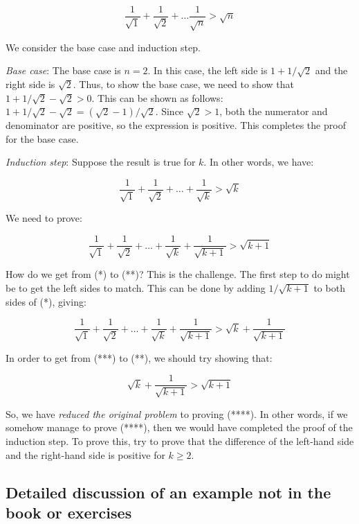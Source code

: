 \documentclass{amsart}
\begin{document}
$$\frac{1}{\sqrt{1}} + \frac{1}{\sqrt{2}} + \dots \frac{1}{\sqrt{n}} > \sqrt{n}$$

We consider the base case and induction step.

{\em Base case}: The base case is $n = 2$. In this case, the left side
is $1 + 1/\sqrt{2}$ and the right side is $\sqrt{2}$. Thus, to show
the base case, we need to show that $1 + 1/\sqrt{2} - \sqrt{2} >
0$. This can be shown as follows: $1 + 1/\sqrt{2} - \sqrt{2} =
(\sqrt{2} - 1)/\sqrt{2}$. Since $\sqrt{2} > 1$, both the numerator and
denominator are positive, so the expression is positive. This
completes the proof for the base case.

{\em Induction step}: Suppose the result is true for $k$. In other
words, we have:

\begin{equation*}
  \frac{1}{\sqrt{1}} + \frac{1}{\sqrt{2}} + \dots + \frac{1}{\sqrt{k}} > \sqrt{k} \tag{*}
\end{equation*}

We need to prove:

\begin{equation*}
  \frac{1}{\sqrt{1}} + \frac{1}{\sqrt{2}} + \dots + \frac{1}{\sqrt{k}} + \frac{1}{\sqrt{k + 1}} > \sqrt{k + 1} \tag{**}
\end{equation*}

How do we get from (*) to (**)? This is the challenge. The first
step to do might be to get the left sides to match. This can be done
by adding $1/\sqrt{k+1}$ to both sides of (*), giving:

\begin{equation*}
  \frac{1}{\sqrt{1}} + \frac{1}{\sqrt{2}} + \dots + \frac{1}{\sqrt{k}} + \frac{1}{\sqrt{k + 1}} > \sqrt{k} + \frac{1}{\sqrt{k + 1}} \tag{***}
\end{equation*}

In order to get from (***) to (**), we should try showing that:

\begin{equation*}
  \sqrt{k} + \frac{1}{\sqrt{k + 1}} > \sqrt{k + 1} \tag{****}
\end{equation*}

So, we have {\em reduced the original problem} to proving (****). In
other words, if we somehow manage to prove (****), then we would
have completed the proof of the induction step. To prove this, try to
prove that the difference of the left-hand side and the right-hand
side is positive for $k \ge 2$.

\subsection{Detailed discussion of an example not in the book or exercises}
\end{document}
